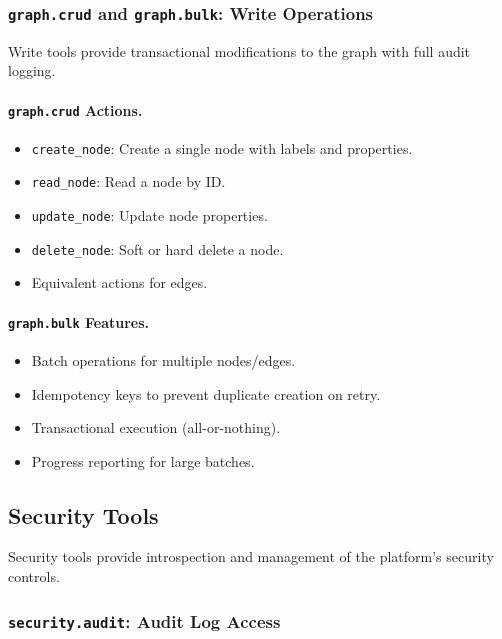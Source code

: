 \subsubsection{\texttt{graph.crud} and \texttt{graph.bulk}: Write Operations}

Write tools provide transactional modifications to the graph with full audit logging.

\paragraph{\texttt{graph.crud} Actions.}
\begin{itemize}
    \item \texttt{create\_node}: Create a single node with labels and properties.
    \item \texttt{read\_node}: Read a node by ID.
    \item \texttt{update\_node}: Update node properties.
    \item \texttt{delete\_node}: Soft or hard delete a node.
    \item Equivalent actions for edges.
\end{itemize}

\paragraph{\texttt{graph.bulk} Features.}
\begin{itemize}
    \item Batch operations for multiple nodes/edges.
    \item Idempotency keys to prevent duplicate creation on retry.
    \item Transactional execution (all-or-nothing).
    \item Progress reporting for large batches.
\end{itemize}

\subsection{Security Tools}
\label{subsec:security-tools}

Security tools provide introspection and management of the platform's security controls.

\subsubsection{\texttt{security.audit}: Audit Log Access}

